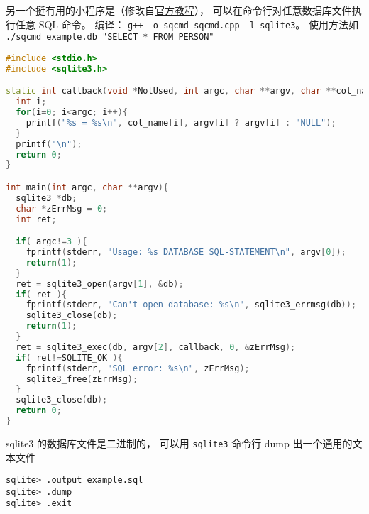 另一个挺有用的小程序是（修改自\href{https://www.sqlite.org/quickstart.html}{官方教程}）， 可以在命令行对任意数据库文件执行任意 SQL 命令。 编译： \verb|g++ -o sqcmd sqcmd.cpp -l sqlite3|。 使用方法如 \verb|./sqcmd example.db "SELECT * FROM PERSON"|
\begin{lstlisting}[language=cpp]
#include <stdio.h>
#include <sqlite3.h>

static int callback(void *NotUsed, int argc, char **argv, char **col_name){
  int i;
  for(i=0; i<argc; i++){
    printf("%s = %s\n", col_name[i], argv[i] ? argv[i] : "NULL");
  }
  printf("\n");
  return 0;
}

int main(int argc, char **argv){
  sqlite3 *db;
  char *zErrMsg = 0;
  int ret;

  if( argc!=3 ){
    fprintf(stderr, "Usage: %s DATABASE SQL-STATEMENT\n", argv[0]);
    return(1);
  }
  ret = sqlite3_open(argv[1], &db);
  if( ret ){
    fprintf(stderr, "Can't open database: %s\n", sqlite3_errmsg(db));
    sqlite3_close(db);
    return(1);
  }
  ret = sqlite3_exec(db, argv[2], callback, 0, &zErrMsg);
  if( ret!=SQLITE_OK ){
    fprintf(stderr, "SQL error: %s\n", zErrMsg);
    sqlite3_free(zErrMsg);
  }
  sqlite3_close(db);
  return 0;
}
\end{lstlisting}

sqlite3 的数据库文件是二进制的， 可以用 \verb|sqlite3| 命令行 dump 出一个通用的文本文件
\begin{lstlisting}[language=none]
sqlite> .output example.sql
sqlite> .dump
sqlite> .exit
\end{lstlisting}

